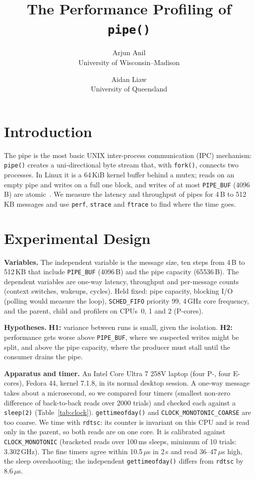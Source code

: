 \documentclass[11pt,twocolumn]{article}
\title{\vspace{-0.55in}\Large\bfseries The Performance Profiling of \texttt{pipe()}\vspace{-0.12in}}
\author{Arjun Anil\\University of Wisconsin--Madison \and Aidan Liaw\\University of Queensland}
\date{}
\begin{document}
\maketitle
\vspace{-0.3in}

\section{Introduction}
The pipe is the most basic UNIX inter-process communication (IPC) mechanism: \texttt{pipe()} creates a uni-directional byte stream that, with \texttt{fork()}, connects two processes. In Linux it is a 64\,KiB kernel buffer behind a mutex; reads on an empty pipe and writes on a full one block, and writes of at most \texttt{PIPE\_BUF} (4096\,B) are atomic~\cite{pipe7}. We measure the latency and throughput of pipes for 4\,B to 512\,KB messages and use \texttt{perf}, \texttt{strace} and \texttt{ftrace} to find where the time goes.

\section{Experimental Design}
\textbf{Variables.} The independent variable is the message size, ten steps from 4\,B to 512\,KB that include \texttt{PIPE\_BUF} (4096\,B) and the pipe capacity (65536\,B). The dependent variables are one-way latency, throughput and per-message counts (context switches, wakeups, cycles). Held fixed: pipe capacity, blocking I/O (polling would measure the loop), \texttt{SCHED\_FIFO} priority 99, 4\,GHz core frequency, and the parent, child and profilers on CPUs~0, 1 and 2 (P-cores).

\textbf{Hypotheses.} \textbf{H1:} variance between runs is small, given the isolation. \textbf{H2:} performance gets worse above \texttt{PIPE\_BUF}, where we suspected writes might be split, and above the pipe capacity, where the producer must stall until the consumer drains the pipe.

\textbf{Apparatus and timer.} An Intel Core Ultra 7 258V laptop (four P-, four E-cores), Fedora 44, kernel 7.1.8, in its normal desktop session. A one-way message takes about a microsecond, so we compared four timers (smallest non-zero difference of back-to-back reads over 2000 trials) and checked each against a \texttt{sleep(2)} (Table~\ref{tab:clock}). \texttt{gettimeofday()} and \texttt{CLOCK\_MONOTONIC\_COARSE} are too coarse. We time with \texttt{rdtsc}: its counter is invariant on this CPU and is read only in the parent, so both reads are on one core. It is calibrated against \texttt{CLOCK\_MONOTONIC} (bracketed reads over 100\,ms sleeps, minimum of 10 trials: 3.302\,GHz). The fine timers agree within 10.5\,$\mu$s in 2\,s and read 36--47\,$\mu$s high, the sleep overshooting; the independent \texttt{gettimeofday()} differs from \texttt{rdtsc} by 8.6\,$\mu$s.
\end{document}
